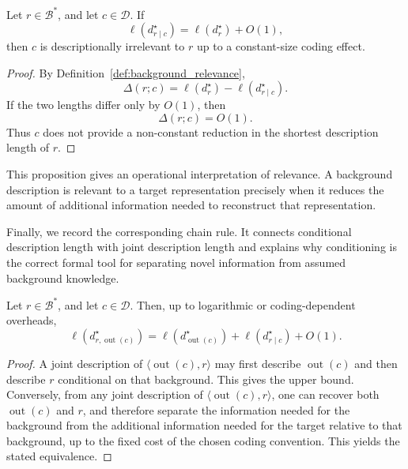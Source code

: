 \begin{proposition}
\label{prop:irrelevant_background}
Let \(r\in\mathcal B^\ast\), and let \(c\in\mathcal D\). If
\[
\ell(d^\star_{r\mid c})
=
\ell(d^\star_r)+O(1),
\]
then \(c\) is descriptionally irrelevant to \(r\) up to a constant-size coding
effect.
\end{proposition}

\begin{proof}
By Definition~\ref{def:background_relevance},
\[
\Delta(r;c)
=
\ell(d^\star_r)-\ell(d^\star_{r\mid c}).
\]
If the two lengths differ only by \(O(1)\), then
\[
\Delta(r;c)=O(1).
\]
Thus \(c\) does not provide a non-constant reduction in the shortest
description length of \(r\).
\end{proof}

This proposition gives an operational interpretation of relevance. A background
description is relevant to a target representation precisely when it reduces
the amount of additional information needed to reconstruct that representation.

Finally, we record the corresponding chain rule. It connects conditional
description length with joint description length and explains why conditioning
is the correct formal tool for separating novel information from assumed
background knowledge.

\begin{proposition}
\label{prop:descriptional_chain_rule}
Let \(r\in\mathcal B^\ast\), and let \(c\in\mathcal D\). Then, up to logarithmic
or coding-dependent overheads,
\[
\ell(d^\star_{r,\operatorname{out}(c)})
=
\ell(d^\star_{\operatorname{out}(c)})
+
\ell(d^\star_{r\mid c})
+
O(1).
\]
\end{proposition}

\begin{proof}
A joint description of \(\langle \operatorname{out}(c),r\rangle\) may first
describe \(\operatorname{out}(c)\) and then describe \(r\) conditional on that
background. This gives the upper bound. Conversely, from any joint description
of \(\langle \operatorname{out}(c),r\rangle\), one can recover both
\(\operatorname{out}(c)\) and \(r\), and therefore separate the information
needed for the background from the additional information needed for the target
relative to that background, up to the fixed cost of the chosen coding
convention. This yields the stated equivalence.
\end{proof}

